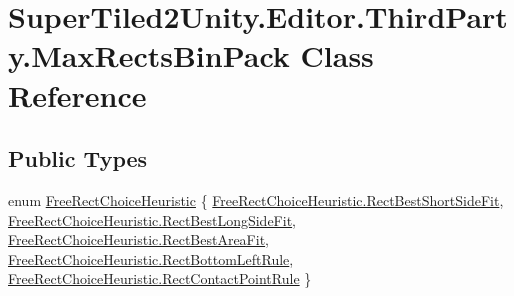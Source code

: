 \hypertarget{class_super_tiled2_unity_1_1_editor_1_1_third_party_1_1_max_rects_bin_pack}{}\section{Super\+Tiled2\+Unity.\+Editor.\+Third\+Party.\+Max\+Rects\+Bin\+Pack Class Reference}
\label{class_super_tiled2_unity_1_1_editor_1_1_third_party_1_1_max_rects_bin_pack}
\subsection*{Public Types}
\begin{DoxyCompactItemize}
\item 
enum \mbox{\hyperlink{class_super_tiled2_unity_1_1_editor_1_1_third_party_1_1_max_rects_bin_pack_a078e71237c51537c9c3445b68f9e980a}{Free\+Rect\+Choice\+Heuristic}} \{ \newline
\mbox{\hyperlink{class_super_tiled2_unity_1_1_editor_1_1_third_party_1_1_max_rects_bin_pack_a078e71237c51537c9c3445b68f9e980aadedea3b2f1e52f028df0a08d6af8ccac}{Free\+Rect\+Choice\+Heuristic.\+Rect\+Best\+Short\+Side\+Fit}}, 
\mbox{\hyperlink{class_super_tiled2_unity_1_1_editor_1_1_third_party_1_1_max_rects_bin_pack_a078e71237c51537c9c3445b68f9e980aa7750ffb6669ea3661d7da8be317aa2ad}{Free\+Rect\+Choice\+Heuristic.\+Rect\+Best\+Long\+Side\+Fit}}, 
\mbox{\hyperlink{class_super_tiled2_unity_1_1_editor_1_1_third_party_1_1_max_rects_bin_pack_a078e71237c51537c9c3445b68f9e980aa519e10d6187dcefe19406185f21e249c}{Free\+Rect\+Choice\+Heuristic.\+Rect\+Best\+Area\+Fit}}, 
\mbox{\hyperlink{class_super_tiled2_unity_1_1_editor_1_1_third_party_1_1_max_rects_bin_pack_a078e71237c51537c9c3445b68f9e980aaaf3590d05143de6c1000307e5d1c757f}{Free\+Rect\+Choice\+Heuristic.\+Rect\+Bottom\+Left\+Rule}}, 
\newline
\mbox{\hyperlink{class_super_tiled2_unity_1_1_editor_1_1_third_party_1_1_max_rects_bin_pack_a078e71237c51537c9c3445b68f9e980aa74676dec9643df6719b3791bb16a7484}{Free\+Rect\+Choice\+Heuristic.\+Rect\+Contact\+Point\+Rule}}
 \}
\end{DoxyCompactItemize}
